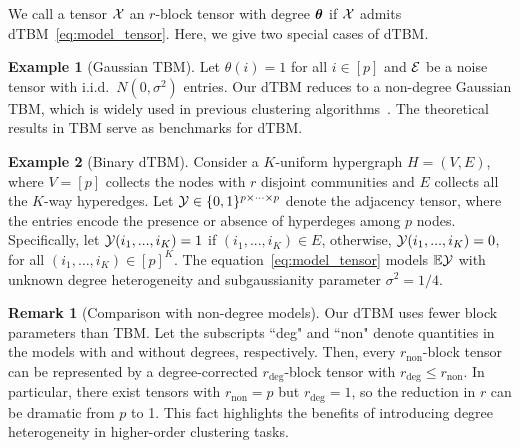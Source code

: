 \documentclass[lettersize,journal]{IEEEtran}
\theoremstyle{definition}
\theoremstyle{definition}
\newtheorem{example}{Example}
\newtheorem{rmk}{Remark}
\begin{document}
We call a tensor $\mathcal{X}$ an $r$-block tensor with degree $\boldsymbol{\theta}$
if $\mathcal{X}$ admits dTBM~\eqref{eq:model_tensor}. Here, we give two special cases of dTBM.
\begin{example}[Gaussian TBM]
Let $\theta(i)= 1$ for all $i \in [p]$ and $\mathcal{E}$ be a noise tensor with i.i.d.\ $N(0,\sigma^2)$ entries. Our dTBM reduces to a non-degree Gaussian TBM, which is widely used in previous clustering algorithms~\citep{wang2019multiway,chi2020provable,han2020exact}. The theoretical results in TBM serve as benchmarks for dTBM. 
\end{example}

\begin{example}[Binary dTBM]
Consider a $K$-uniform hypergraph $H = (V,E)$, where $V = [p]$ collects the nodes with $r$ disjoint communities and $E$ collects all the $K$-way hyperedges. Let $\mathcal{Y} \in \{0,1\}^{p \times \cdots \times p}$ denote the adjacency tensor, where the entries encode the presence or absence of hyperdeges among $p$ nodes. Specifically, let $\mathcal{Y}(i_1,...,i_K) = 1$ if  $(i_1,...,i_K) \in E$, otherwise, $\mathcal{Y}(i_1,...,i_K) = 0$, for all $(i_1,\ldots,i_K) \in [p]^K$. The equation~\eqref{eq:model_tensor} models $\mathbb{E}\mathcal{Y}$ with unknown degree heterogeneity and subgaussianity parameter $\sigma^2 = 1/4$. 
\end{example}

\begin{rmk}[Comparison with non-degree models]
Our dTBM uses fewer block parameters than TBM. Let the subscripts ``deg" and ``non" denote quantities in the models with and without degrees, respectively. Then, every $r_{\text{non}}$-block tensor can be represented by a degree-corrected $r_{\text{deg}}$-block tensor with $r_{\text{deg}}\leq r_{\text{non}}$. In particular, there exist tensors with $r_{\text{non}}=p$ but $r_{\text{deg}}=1$, so the reduction in $r$ can be dramatic from $p$ to 1. This fact highlights the benefits of introducing degree heterogeneity in higher-order clustering tasks.
\end{rmk}

\end{document}
